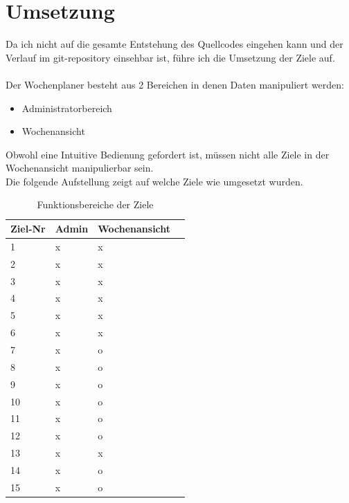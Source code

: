 \section{Umsetzung}
Da ich nicht auf die gesamte Entstehung des Quellcodes eingehen kann und der Verlauf im git-repository einsehbar ist,
führe ich die Umsetzung der Ziele auf.\\\\
Der Wochenplaner besteht aus 2 Bereichen in denen Daten manipuliert werden:
\begin{itemize}
    \item Administratorbereich
    \item Wochenansicht\\
\end{itemize}
Obwohl eine Intuitive Bedienung gefordert ist, müssen nicht alle Ziele in der Wochenansicht manipulierbar sein.\\
Die folgende Aufstellung zeigt auf welche Ziele wie umgesetzt wurden.\\

\begin{table}[!ht]
\begin{center}
    \begin{longtable}{llp{3cm}l}
        \toprule Ziel-Nr & Admin & Wochenansicht \\
        \midrule 1 & x & x \\
        \midrule 2 & x & x \\
        \midrule 3 & x & x \\
        \midrule 4 & x & x \\
        \midrule 5 & x & x \\
        \midrule 6 & x & x \\ 
        \midrule 7 & x & o \\
        \midrule 8 & x & o \\
        \midrule 9 & x & o \\
        \midrule 10 & x & o \\
        \midrule 11 & x & o \\
        \midrule 12 & x & o \\
        \midrule 13 & x & x \\
        \midrule 14 & x & o \\
        \midrule 15 & x & o \\
        \bottomrule
        \end{longtable}
    \caption{Funktionsbereiche der Ziele}
    \label{tab:funktionsbereiche_ziele}
\end{center}
\end{table}

